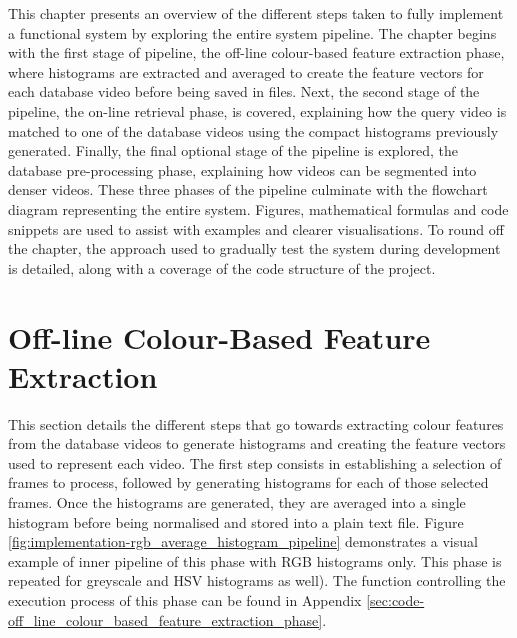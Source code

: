 This chapter presents an overview of the different steps taken to fully implement a functional system by exploring the entire system pipeline. The chapter begins with the first stage of pipeline, the off-line colour-based feature extraction phase, where histograms are extracted and averaged to create the feature vectors for each database video before being saved in files. Next, the second stage of the pipeline, the on-line retrieval phase, is covered, explaining how the query video is matched to one of the database videos using the compact histograms previously generated. Finally, the final optional stage of the pipeline is explored, the database pre-processing phase, explaining how videos can be segmented into denser videos. These three phases of the pipeline culminate with the flowchart diagram representing the entire system. Figures, mathematical formulas and code snippets are used to assist with examples and clearer visualisations. To round off the chapter, the approach used to gradually test the system during development is detailed, along with a coverage of the code structure of the project.


\section{Off-line Colour-Based Feature Extraction}
\label{sec:implementation-offline-colour-based-feature-extraction}

This section details the different steps that go towards extracting colour features from the database videos to generate histograms and creating the feature vectors used to represent each video. The first step consists in establishing a selection of frames to process, followed by generating histograms for each of those selected frames. Once the histograms are generated, they are averaged into a single histogram before being normalised and stored into a plain text file. Figure \ref{fig:implementation-rgb_average_histogram_pipeline} demonstrates a visual example of inner pipeline of this phase with RGB histograms only. This phase is repeated for greyscale and HSV histograms as well). The function controlling the execution process of this phase can be found in Appendix \ref{sec:code-off_line_colour_based_feature_extraction_phase}.\\

